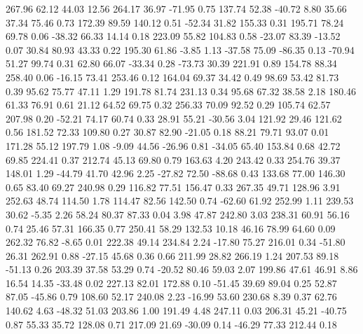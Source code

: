   267.96   62.12   44.03   12.56
  264.17   36.97  -71.95    0.75
  137.74   52.38  -40.72    8.80
   35.66   37.34   75.46    0.73
  172.39   89.59  140.12    0.51
  -52.34   31.82  155.33    0.31
  195.71   78.24   69.78    0.06
  -38.32   66.33   14.14    0.18
  223.09   55.82  104.83    0.58
  -23.07   83.39  -13.52    0.07
   30.84   80.93   43.33    0.22
  195.30   61.86   -3.85    1.13
  -37.58   75.09  -86.35    0.13
  -70.94   51.27   99.74    0.31
   62.80   66.07  -33.34    0.28
  -73.73   30.39  221.91    0.89
  154.78   88.34  258.40    0.06
  -16.15   73.41  253.46    0.12
  164.04   69.37   34.42    0.49
   98.69   53.42   81.73    0.39
   95.62   75.77   47.11    1.29
  191.78   81.74  231.13    0.34
   95.68   67.32   38.58    2.18
  180.46   61.33   76.91    0.61
   21.12   64.52   69.75    0.32
  256.33   70.09   92.52    0.29
  105.74   62.57  207.98    0.20
  -52.21   74.17   60.74    0.33
   28.91   55.21  -30.56    3.04
  121.92   29.46  121.62    0.56
  181.52   72.33  109.80    0.27
   30.87   82.90  -21.05    0.18
   88.21   79.71   93.07    0.01
  171.28   55.12  197.79    1.08
   -9.09   44.56  -26.96    0.81
  -34.05   65.40  153.84    0.68
   42.72   69.85  224.41    0.37
  212.74   45.13   69.80    0.79
  163.63    4.20  243.42    0.33
  254.76   39.37  148.01    1.29
  -44.79   41.70   42.96    2.25
  -27.82   72.50  -88.68    0.43
  133.68   77.00  146.30    0.65
   83.40   69.27  240.98    0.29
  116.82   77.51  156.47    0.33
  267.35   49.71  128.96    3.91
  252.63   48.74  114.50    1.78
  114.47   82.56  142.50    0.74
  -62.60   61.92  252.99    1.11
  239.53   30.62   -5.35    2.26
   58.24   80.37   87.33    0.04
    3.98   47.87  242.80    3.03
  238.31   60.91   56.16    0.74
   25.46   57.31  166.35    0.77
  250.41   58.29  132.53   10.18
   46.16   78.99   64.60    0.09
  262.32   76.82   -8.65    0.01
  222.38   49.14  234.84    2.24
  -17.80   75.27  216.01    0.34
  -51.80   26.31  262.91    0.88
  -27.15   45.68    0.36    0.66
  211.99   28.82  266.19    1.24
  207.53   89.18  -51.13    0.26
  203.39   37.58   53.29    0.74
  -20.52   80.46   59.03    2.07
  199.86   47.61   46.91    8.86
   16.54   14.35  -33.48    0.02
  227.13   82.01  172.88    0.10
  -51.45   39.69   89.04    0.25
   52.87   87.05  -45.86    0.79
  108.60   52.17  240.08    2.23
  -16.99   53.60  230.68    8.39
    0.37   62.76  140.62    4.63
  -48.32   51.03  203.86    1.00
  191.49    4.48  247.11    0.03
  206.31   45.21  -40.75    0.87
   55.33   35.72  128.08    0.71
  217.09   21.69  -30.09    0.14
  -46.29   77.33  212.44    0.18
